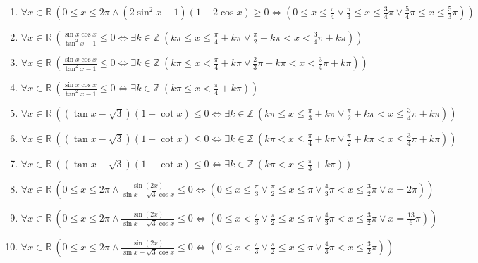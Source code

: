 \documentclass[11pt,a4paper]{article}
\begin{document}
\begin{enumerate}
\item $\displaystyle \forall x \in \mathbb{R}\ \left( 0 \le x \le 2\pi \land (2\sin^{2} x - 1)(1 - 2\cos x) \ge 0 \iff \left( 0 \le x \le \frac{\pi}{4} \lor \frac{\pi}{3} \le x \le \frac{3}{4}\pi \lor \frac{5}{4}\pi \le x \le \frac{5}{3}\pi \right) \right)$
\item $\displaystyle \forall x \in \mathbb{R}\ \left( \frac{\sin x \cos x}{\tan^{2} x - 1} \le 0 \iff \exists k \in \mathbb{Z}\ \left( k\pi \le x \le \frac{\pi}{4} + k\pi \lor \frac{\pi}{2} + k\pi < x < \frac{3}{4}\pi + k\pi \right) \right)$
\item $\displaystyle \forall x \in \mathbb{R}\ \left( \frac{\sin x \cos x}{\tan^{2} x - 1} \le 0 \iff \exists k \in \mathbb{Z}\ \left( k\pi \le x < \frac{\pi}{4} + k\pi \lor \frac{2}{3}\pi + k\pi < x < \frac{3}{4}\pi + k\pi \right) \right)$
\item $\displaystyle \forall x \in \mathbb{R}\ \left( \frac{\sin x \cos x}{\tan^{2} x - 1} \le 0 \iff \exists k \in \mathbb{Z}\ \left( k\pi \le x < \frac{\pi}{4} + k\pi \right) \right)$
\item $\displaystyle \forall x \in \mathbb{R}\ \left( (\tan x - \sqrt{3})(1 + \cot x) \le 0 \iff \exists k \in \mathbb{Z}\ \left( k\pi \le x \le \frac{\pi}{3} + k\pi \lor \frac{\pi}{2} + k\pi < x \le \frac{3}{4}\pi + k\pi \right) \right)$
\item $\displaystyle \forall x \in \mathbb{R}\ \left( (\tan x - \sqrt{3})(1 + \cot x) \le 0 \iff \exists k \in \mathbb{Z}\ \left( k\pi < x \le \frac{\pi}{4} + k\pi \lor \frac{\pi}{2} + k\pi < x \le \frac{3}{4}\pi + k\pi \right) \right)$
\item $\displaystyle \forall x \in \mathbb{R}\ \left( (\tan x - \sqrt{3})(1 + \cot x) \le 0 \iff \exists k \in \mathbb{Z}\ \left( k\pi < x \le \frac{\pi}{3} + k\pi \right) \right)$
\item $\displaystyle \forall x \in \mathbb{R}\ \left( 0 \le x \le 2\pi \land \frac{\sin\left(2x\right)}{\sin x - \sqrt{3}\cos x} \le 0 \iff \left( 0 \le x \le \frac{\pi}{3} \lor \frac{\pi}{2} \le x \le \pi \lor \frac{4}{3}\pi < x \le \frac{3}{2}\pi \lor x = 2\pi \right) \right)$
\item $\displaystyle \forall x \in \mathbb{R}\ \left( 0 \le x \le 2\pi \land \frac{\sin\left(2x\right)}{\sin x - \sqrt{3}\cos x} \le 0 \iff \left( 0 \le x < \frac{\pi}{3} \lor \frac{\pi}{2} \le x \le \pi \lor \frac{4}{3}\pi < x \le \frac{3}{2}\pi \lor x = \frac{13}{6}\pi \right) \right)$
\item $\displaystyle \forall x \in \mathbb{R}\ \left( 0 \le x \le 2\pi \land \frac{\sin\left(2x\right)}{\sin x - \sqrt{3}\cos x} \le 0 \iff \left( 0 \le x < \frac{\pi}{3} \lor \frac{\pi}{2} \le x \le \pi \lor \frac{4}{3}\pi < x \le \frac{3}{2}\pi \right) \right)$

\end{enumerate}
\end{document}
